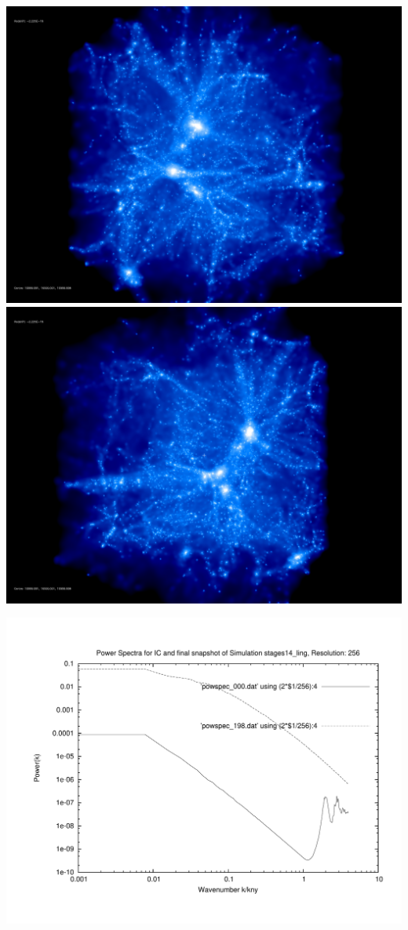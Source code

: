 \includegraphics[scale=0.1]{r256/stages14_ling/rotate_00074.jpg} 
\includegraphics[scale=0.1]{r256/stages14_ling/rotate_00131.jpg}

\includegraphics[scale=0.5]{r256/stages14_ling/plot_powspec_stages14_ling}

